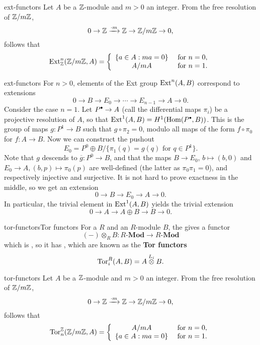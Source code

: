 \begin{example}{ext-functors}
    Let $A$ be a $\mathbb{Z}$-module and $m > 0$ an integer. From the free resolution of $\mathbb{Z}/m\mathbb{Z}$,
    \[ 0 \to \mathbb{Z} \xrightarrow{\cdot m} \mathbb{Z} \to \mathbb{Z} / m \mathbb{Z} \to 0 , \]
    follows that
    \[ \textup{Ext}^n_{\mathbb{Z}}(\mathbb{Z}/m\mathbb{Z}, A) = \left\{ \begin{array}{cl} \{ a \in A : ma = 0 \} & \textup{ for } n = 0 , \\ A/mA & \textup{ for } n = 1 . \end{array} \right. \]
\end{example}

\begin{example}{ext-functors}
    For $n > 0$, elements of the Ext group $\textup{Ext}^n(A, B)$ correspond to extensions
    \[ 0 \to B \to E_0 \to \cdots \to E_{n - 1} \to A \to 0 . \]
    Consider the case $n = 1$. Let $P^\bdot \to A$ (call the differential maps $\pi_i$) be a projective resolution of $A$, so that $\textup{Ext}^1(A, B) = H^1(\Hom(P^\bdot, B))$. This is the group of maps $g \colon P^1 \to B$ such that $g \circ \pi_2 = 0$, modulo all maps of the form $f \circ \pi_0$ for $f \colon A \to B$. Now we can construct the pushout
    \[ E_0 = P^0 \oplus B / \{ \pi_1(q) = g(q) \text{ for } q \in P^1 \} . \]
    Note that $g$ descends to $\overline{g} \colon P^0 \to B$, and that the maps $B \to E_0$, $b \mapsto (b, 0)$ and $E_0 \to A, (b, p) \mapsto \pi_0(p)$ are well-defined (the latter as $\pi_0 \pi_1 = 0$), and respectively injective and surjective. It is not hard to prove exactness in the middle, so we get an extension
    \[ 0 \to B \to E_0 \to A \to 0 . \]
    In particular, the trivial element in $\textup{Ext}^1(A, B)$ yields the trivial extension
    \[ 0 \to A \to A \oplus B \to B \to 0 . \]
\end{example}

\begin{topic}{tor-functors}{Tor functors}
    For a  $R$ and an $R$-module $B$, the  gives a functor
    \[ (-) \otimes_R B \colon R\textbf{-Mod} \to R\textbf{-Mod} \]
    which is , so it has , which are known as the \textbf{Tor functors}
    \[ \textup{Tor}^R_i(A, B) = A \overset{L_i}{\otimes} B . \]
\end{topic}

\begin{example}{tor-functors}
    Let $A$ be a $\mathbb{Z}$-module and $m > 0$ an integer. From the free resolution of $\mathbb{Z}/m\mathbb{Z}$,
    \[ 0 \to \mathbb{Z} \xrightarrow{\cdot m} \mathbb{Z} \to \mathbb{Z} / m \mathbb{Z} \to 0 , \]
    follows that
    \[ \textup{Tor}_n^{\mathbb{Z}}(\mathbb{Z}/m\mathbb{Z}, A) = \left\{ \begin{array}{cl} A/mA & \textup{ for } n = 0 , \\ \{ a \in A : ma = 0 \} & \textup{ for } n = 1 . \end{array} \right. \]
\end{example}

